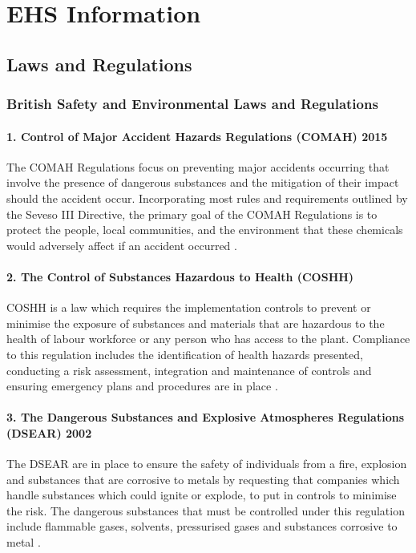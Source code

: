 \section{EHS Information}
\label{app:EHS}

\subsection{Laws and Regulations }

\subsubsection{British Safety and Environmental Laws and Regulations}
\paragraph{1. Control of Major Accident Hazards Regulations (COMAH) 2015} 

The COMAH Regulations focus on preventing major accidents occurring that involve the presence of dangerous substances and the mitigation of their impact should the accident occur. Incorporating most rules and requirements outlined by the Seveso III Directive, the primary goal of the COMAH Regulations is to protect the people, local communities, and the environment that these chemicals would adversely affect if an accident occurred \cite{govuk_control_nodate}. 

\paragraph{2. The Control of Substances Hazardous to Health (COSHH) }

COSHH is a law which requires the implementation controls to prevent or minimise the exposure of substances and materials that are hazardous to the health of labour workforce or any person who has access to the plant. Compliance to this regulation includes the identification of health hazards presented, conducting a risk assessment, integration and maintenance of controls and ensuring emergency plans and procedures are in place \cite{govuk_what_nodate}.

\paragraph{3. The Dangerous Substances and Explosive Atmospheres Regulations (DSEAR) 2002}

The DSEAR are in place to ensure the safety of individuals from a fire, explosion and substances that are corrosive to metals by requesting that companies which handle substances which could ignite or explode, to put in controls to minimise the risk. The dangerous substances that must be controlled under this regulation include flammable gases, solvents, pressurised gases and substances corrosive to metal \cite{govuk_dangerous_nodate}. 

